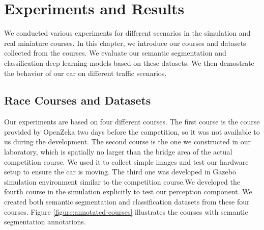 \chapter{Experiments and Results}
\label{chp:b6}

We conducted various experiments for different scenarios in the simulation and
real miniature courses. In this chapter, we introduce our courses and datasets
collected from the courses. We evaluate our semantic segmentation and
classification deep learning models based on these datasets. We then demostrate
the behavior of our car on different traffic scenarios.

\section{Race Courses and Datasets}

Our experiments are based on four different courses. The first course is the
course provided by OpenZeka  two days before the competition, so it was not
available to us during the development. The second course is the one we
constructed in our laboratory, which is spatially no larger than the bridge
area of the actual competition course. We used it to collect simple images and
test our hardware setup to ensure the car is moving. The third one was
developed in Gazebo simulation environment similar to the competition course.We
developed the fourth course in the simulation explicitly to test our perception
component. We created both semantic segmentation and classification datasets
from these four courses. Figure \ref{figure:annotated-courses} illustrates the
courses with semantic segmentation annotations.

